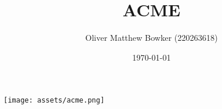 \documentclass{article}
\title{ACME}
\author{Oliver Matthew Bowker (220263618)}
\date{\today}
\begin{document}
  \maketitle
  \begin{center}
    \texttt{[image: assets/acme.png]}
  \end{center}
  \newpage

  \tableofcontents
  \newpage

  \listoffigures
  \newpage

  \listoftables
  \newpage

  
  
  
  
  
  
  
  
\end{document}
